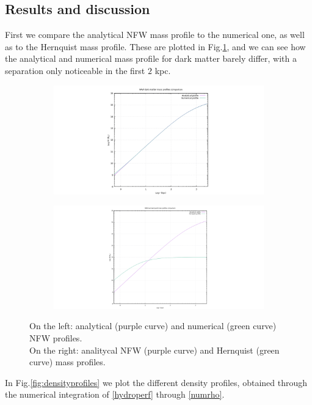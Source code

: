 \documentclass{article}
\begin{document}
\subsection{Results and discussion}
First we compare the analytical NFW mass profile to the numerical one, as well as to the Hernquist mass profile. These are plotted in Fig.\ref{fig:massprofiles}, and we can see how the analytical and numerical mass profile for dark matter barely differ, with a separation only noticeable in the first $2$ kpc.
\begin{figure}[H]
	
	\begin{subfigure}{0.49\textwidth}
		\includegraphics[width=0.9\linewidth]{dm_mass_profile.png}
	\end{subfigure}
	\begin{subfigure}{0.49\textwidth}
		\includegraphics[width=0.9\linewidth]{mass_profiles.png}
	\end{subfigure}
	\centering
	\caption{On the left: analytical (purple curve) and numerical (green curve) NFW profiles. \\On the right: analitycal NFW (purple curve) and Hernquist (green curve) mass profiles.}
	\label{fig:massprofiles}
\end{figure}
In Fig.\ref{fig:densityprofiles} we plot the different density profiles, obtained through the numerical integration of \eqref{hydroperf} through \eqref{numrho}. \\
\end{document}
